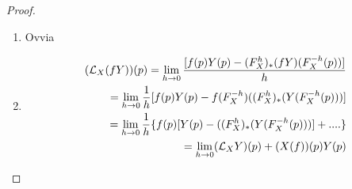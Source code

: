 \begin{proof}
	\begin{enumerate}
	 \item Ovvia
	 \item 
	 \begin{align*}
	 (\mathcal L_X(fY))(p)=\lim_{h\to 0} \frac{[f(p)Y(p)-(F_X^h)_*(fY)(F_X^{-h}(p))]}h\\
	 =\lim_{h\to 0}\frac 1h [f(p)Y(p)-f(F_X^{-h}) ((F_X^h)_*(Y(F_X^{-h}(p)))]\\
	 =\lim_{h\to 0}\frac 1h \{f(p)[Y(p)-((F_X^h)_*(Y(F_X^{-h}(p)))]+....\}\\
	 =\lim_{h\to 0} (\mathcal L_XY)(p)+(X(f))(p)Y(p)
	 \end{align*}
	 \end{enumerate}

\end{proof}




